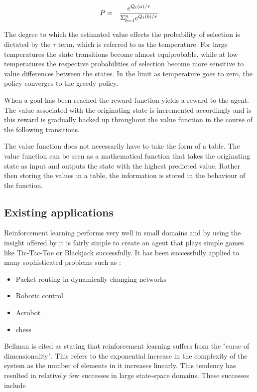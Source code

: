 \documentclass{rucsthesis}
\begin{document}
\begin{eqnarray}
\centering
P & = & \frac{e^{Q_{t}(a)/\tau}}{\Sigma_{b=1}^{n}e^{Q_{t}(b)/\tau}} \label{eq:softmax}
\end{eqnarray}

The degree to which the estimated value effects the probability of selection is dictated by the $\tau$ term, which is referred to as the temperature. For large temperatures the state transitions become almost equiprobable, while at low temperatures the respective probabilities of selection become more sensitive to value differences between the states.  In the limit as temperature goes to zero, the policy converges to the greedy policy.

When a goal has been reached the reward function yields a reward to the agent.  The value  associated with the originating state is incremented accordingly and is this reward is gradually backed up throughout the value function in the course of the following transitions\citep{suttonbarto}.

The value function does not necessarily have to take the form of a table. The value function can be seen as a mathematical function that takes the originating state as input and outputs the state with the highest predicted value. Rather then storing the values in a table, the information is stored in the behaviour of the function.

\subsection{Existing applications}

Reinforcement learning performs very well in small domains and by using the insight offered by \cite{suttonbarto} it is fairly simple to create an agent that plays simple games like Tic-Tac-Toe or Blackjack successfully. It has been successfully applied to many sophisticated problems such as :

\begin{itemize}
\item{Packet routing in dynamically changing networks \citep{boyan94packet}}
\item{Robotic control \citep{rlrobotics}}
\item{Acrobot \citep{suttonbarto} }
\item{chess \citep{baxter98knightcap}}
\end{itemize}

Bellman is cited \citep{suttonbarto} as stating that reinforcement learning suffers from the "curse of dimensionality".  This refers to the exponential increase in the complexity of the system as the number of elements in it increases linearly. This tendency has resulted in relatively few successes in large state-space domains\citep{keepaway}. These successes include 
\end{document}
